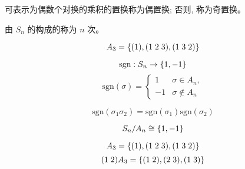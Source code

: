 \begin{frame}{}
  \begin{definition}
    可表示为偶数个对换的乘积的置换称为偶置换; 否则, 称为奇置换。
  \end{definition}

  \pause
  \vspace{0.80cm}
  \begin{definition}
    由 $S_{n}$ 的构成的称为 $n$ 次。
  \end{definition}

  \pause
  \[
    A_{3} = \{(1), (1\;2\;3), (1\;3\;2)\}
  \]
\end{frame}

\begin{frame}{}
  \[
    \text{sgn}: S_{n} \to \{1, -1\}
  \]
  \[
    \text{sgn}(\sigma) = \begin{cases}
      1 & \sigma \in A_{n}, \\
      -1 & \sigma \notin A_{n}
    \end{cases}
  \]

  \pause
  \[
    \text{sgn}(\sigma_{1}\sigma_{2}) = \text{sgn}(\sigma_{1})\text{sgn}(\sigma_{2})
  \]

  \pause
  \[
    S_{n}/A_{n} \cong \{1, -1\}
  \]
\end{frame}

\begin{frame}{}

  \[
    A_{3} = \{(1), (1\;2\;3), (1\;3\;2)\}
  \]
  \[
    (1\;2) A_{3} = \{(1\;2), (2\;3), (1\;3)\}
  \]
\end{frame}
